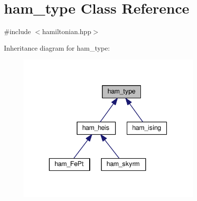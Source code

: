 \hypertarget{classham__type}{}\section{ham\+\_\+type Class Reference}
\label{classham__type}


{\ttfamily \#include $<$hamiltonian.\+hpp$>$}



Inheritance diagram for ham\+\_\+type\+:\nopagebreak
\begin{figure}[H]
\begin{center}
\leavevmode
\includegraphics[width=261pt]{d5/d48/classham__type__inherit__graph}
\end{center}
\end{figure}
